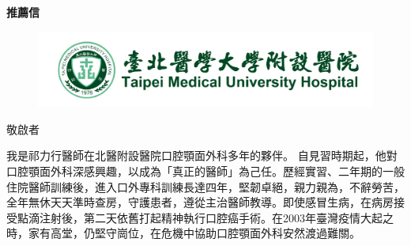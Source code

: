 \documentclass{letter}
\date{}
\begin{document}
\begin{letter}
{
\centering \Large \textbf{推薦信}
}

\hfill
\begin{figure}%
    \includegraphics[width=0.3\textheight]{TMUH_logo.png}
\end{figure}

\opening{敬啟者} %
\medskip 



\indent 我是祁力行醫師在北醫附設醫院口腔顎面外科多年的夥伴。
自見習時期起，他對口腔顎面外科深感興趣，以成為「真正的醫師」為己任。歷經實習、二年期的一般住院醫師訓練後，進入口外專科訓練長達四年，堅韌卓絕，親力親為，不辭勞苦，全年無休天天準時查房，守護患者，遵從主治醫師教導。即使感冒生病，在病房接受點滴注射後，第二天依舊打起精神執行口腔癌手術。在2003年臺灣疫情大起之時，家有高堂，仍堅守崗位，在危機中協助口腔顎面外科安然渡過難關。



\end{letter}
\end{document}
